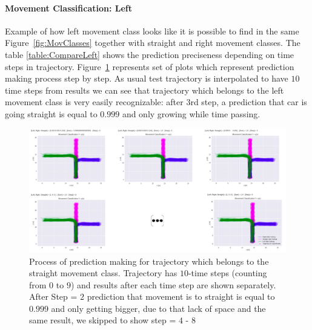 \paragraph{Movement Classification: Left}

Example of how left movement class looks like it is possible to find in the same Figure~\ref{fig:MovClasses} together with straight and right movement classes. The table \ref{table:CompareLeft} shows the prediction preciseness depending on time steps in trajectory. Figure~\ref{fig:leftPrediction} represents set of plots which represent prediction making process step by step. As usual test trajectory is interpolated to have $10$ time steps from results we can see that trajectory which belongs to the left movement class is very easily recognizable: after $3$rd step, a prediction that car is going straight is equal to $0.999$ and only growing while time passing. 

\begin{figure}[H]
	\centering  	
	\includegraphics[width=16cm]{img/0_prediction_left.PNG}
	\caption{Process of prediction making for trajectory which belongs to the straight movement class. Trajectory has $10$-time steps (counting from $0$ to $9$) and results after each time step are shown separately. After Step = $2$  prediction that movement is to straight is equal to $0.999$ and only getting bigger, due to that lack of space and the same result, we skipped to show step = $4$ - $8$}
	\label{fig:leftPrediction}    
\end{figure}


